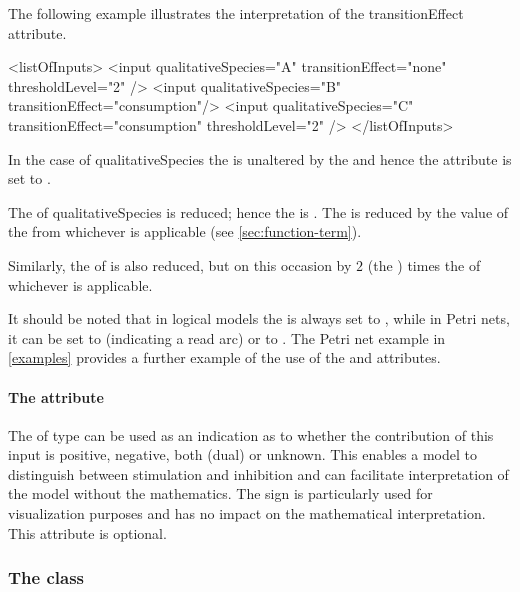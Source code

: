 The following example illustrates the interpretation of the transitionEffect attribute. 

\begin{example}
<listOfInputs>
    <input qualitativeSpecies="A"   transitionEffect="none"        thresholdLevel="2" />
    <input qualitativeSpecies="B"   transitionEffect="consumption"/>
    <input qualitativeSpecies="C"   transitionEffect="consumption" thresholdLevel="2" />
</listOfInputs>
\end{example}

In the case of qualitativeSpecies  the  is unaltered by the \Transition and hence the  attribute is set to . 

The  of qualitativeSpecies  is reduced; hence the  is . The  is reduced by the value of the  from whichever \FunctionTerm is applicable  (see \ref{sec:function-term}). 

Similarly, the  of  is also reduced, but on this occasion by $2$ (the ) times the  of whichever \FunctionTerm is applicable. 

It should be noted that in logical models the  is always set to , while in Petri nets, it can be set to  (indicating a read arc) or to .  The Petri net example in \ref{examples} provides a further example of the use of the  and  attributes. 


 
\paragraph{The  attribute}
The  of type  can be used as an indication as to whether the contribution of this input is positive, negative, both (dual) or unknown. This enables a model to distinguish between stimulation and inhibition and can facilitate interpretation of the model without the mathematics. The sign is particularly used for visualization purposes and has no impact on the mathematical interpretation. This attribute is optional.


\subsubsection{The  class}
\label{output-class}

